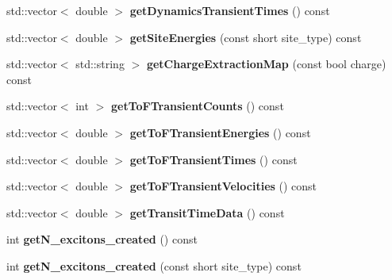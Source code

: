 \begin{DoxyCompactItemize}
\item 
\mbox{\label{class_o_s_c___sim_acde6068549f59f813d2faed73f6fedc9}} 
std\+::vector$<$ double $>$ {\bfseries get\+Dynamics\+Transient\+Times} () const
\item 
\mbox{\label{class_o_s_c___sim_aae233390486c4db28a72936dd7d398f1}} 
std\+::vector$<$ double $>$ {\bfseries get\+Site\+Energies} (const short site\+\_\+type) const
\item 
\mbox{\label{class_o_s_c___sim_a6ce1e72c2a7d1161f844ebd46231c961}} 
std\+::vector$<$ std\+::string $>$ {\bfseries get\+Charge\+Extraction\+Map} (const bool charge) const
\item 
\mbox{\label{class_o_s_c___sim_aa3e0342b2a8c7dc5a62211dd6161027f}} 
std\+::vector$<$ int $>$ {\bfseries get\+To\+F\+Transient\+Counts} () const
\item 
\mbox{\label{class_o_s_c___sim_a03028810d8edc276ed7ab0a8228feaaa}} 
std\+::vector$<$ double $>$ {\bfseries get\+To\+F\+Transient\+Energies} () const
\item 
\mbox{\label{class_o_s_c___sim_a01a190017bc7a7e04c6af824fa47dbce}} 
std\+::vector$<$ double $>$ {\bfseries get\+To\+F\+Transient\+Times} () const
\item 
\mbox{\label{class_o_s_c___sim_a15a47ed6657c8301eac0c938f8887324}} 
std\+::vector$<$ double $>$ {\bfseries get\+To\+F\+Transient\+Velocities} () const
\item 
\mbox{\label{class_o_s_c___sim_ac5a6b2ae37d49b9114fe032f533e41c6}} 
std\+::vector$<$ double $>$ {\bfseries get\+Transit\+Time\+Data} () const
\item 
\mbox{\label{class_o_s_c___sim_ad38ee5ecfdd65fe4d162763842a2a4b6}} 
int {\bfseries get\+N\+\_\+excitons\+\_\+created} () const
\item 
\mbox{\label{class_o_s_c___sim_a3159c7445f114390c7fb52fa73d559ef}} 
int {\bfseries get\+N\+\_\+excitons\+\_\+created} (const short site\+\_\+type) const

\end{DoxyCompactItemize}
